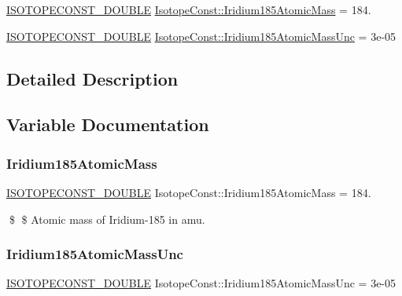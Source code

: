 \begin{DoxyCompactItemize}
\item 
\mbox{\hyperlink{group___isotope_const-_macros_ga8f45a7272ce02c0b4c65c44636ed719a}{I\+S\+O\+T\+O\+P\+E\+C\+O\+N\+S\+T\+\_\+\+D\+O\+U\+B\+LE}} \mbox{\hyperlink{group___isotope_const-_iridium-_ir185_ga325015812254978528a7ab2780966c4f}{Isotope\+Const\+::\+Iridium185\+Atomic\+Mass}} = 184.
\item 
\mbox{\hyperlink{group___isotope_const-_macros_ga8f45a7272ce02c0b4c65c44636ed719a}{I\+S\+O\+T\+O\+P\+E\+C\+O\+N\+S\+T\+\_\+\+D\+O\+U\+B\+LE}} \mbox{\hyperlink{group___isotope_const-_iridium-_ir185_ga6a0779c78313e350c47d87c2488c8070}{Isotope\+Const\+::\+Iridium185\+Atomic\+Mass\+Unc}} = 3e-\/05
\end{DoxyCompactItemize}


\subsection{Detailed Description}


\subsection{Variable Documentation}
\mbox{\label{group___isotope_const-_iridium-_ir185_ga325015812254978528a7ab2780966c4f}} 
\subsubsection{\texorpdfstring{Iridium185\+Atomic\+Mass}{Iridium185AtomicMass}}
{\footnotesize\ttfamily \mbox{\hyperlink{group___isotope_const-_macros_ga8f45a7272ce02c0b4c65c44636ed719a}{I\+S\+O\+T\+O\+P\+E\+C\+O\+N\+S\+T\+\_\+\+D\+O\+U\+B\+LE}} Isotope\+Const\+::\+Iridium185\+Atomic\+Mass = 184.}

\$ \$ Atomic mass of Iridium-\/185 in amu. \mbox{\label{group___isotope_const-_iridium-_ir185_ga6a0779c78313e350c47d87c2488c8070}} 
\subsubsection{\texorpdfstring{Iridium185\+Atomic\+Mass\+Unc}{Iridium185AtomicMassUnc}}
{\footnotesize\ttfamily \mbox{\hyperlink{group___isotope_const-_macros_ga8f45a7272ce02c0b4c65c44636ed719a}{I\+S\+O\+T\+O\+P\+E\+C\+O\+N\+S\+T\+\_\+\+D\+O\+U\+B\+LE}} Isotope\+Const\+::\+Iridium185\+Atomic\+Mass\+Unc = 3e-\/05}

